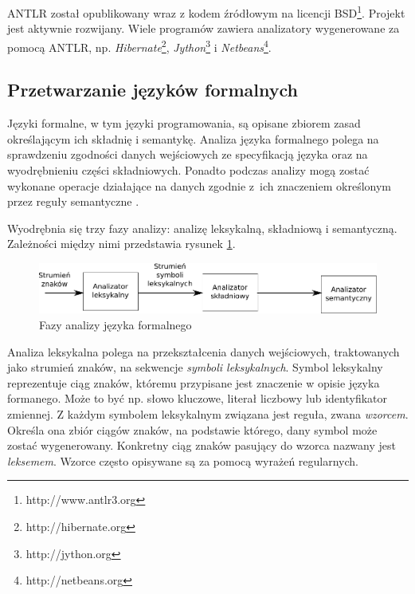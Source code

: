 ANTLR został opublikowany wraz z kodem źródłowym na licencji BSD\footnote{http://www.antlr3.org}. 
Projekt jest
aktywnie rozwijany. Wiele programów zawiera analizatory wygenerowane za pomocą
ANTLR, np. \emph{Hibernate}\footnote{http://hibernate.org}, \emph{Jython}\footnote{http://jython.org}
i \emph{Netbeans}\footnote{http://netbeans.org}.

\subsection{Przetwarzanie języków formalnych}
Języki formalne, w tym języki programowania, są opisane zbiorem zasad określającym
ich składnię i semantykę. Analiza języka formalnego polega na sprawdzeniu zgodności
danych wejściowych ze specyfikacją języka oraz na wyodrębnieniu części składniowych.
Ponadto podczas analizy mogą zostać wykonane operacje działające na danych zgodnie
z~ich znaczeniem określonym przez reguły semantyczne \cite{compilers}.

Wyodrębnia się trzy fazy analizy: analizę leksykalną, składniową i semantyczną. 
Zależności między nimi przedstawia rysunek \ref{antlr_phases}. 


\begin{figure}[h]
  \centering
    \includegraphics[width=\textwidth]{img/antlr_phases.pdf}
    \caption{Fazy analizy języka formalnego}
    \label{antlr_phases}
\end{figure}


Analiza leksykalna polega na przekształcenia danych wejściowych, traktowanych jako 
strumień znaków, na sekwencje \emph{symboli leksykalnych}. Symbol leksykalny reprezentuje
ciąg znaków, któremu przypisane jest znaczenie w opisie języka formanego. Może to 
być np. słowo kluczowe, literał liczbowy lub identyfikator zmiennej.
Z każdym symbolem leksykalnym związana jest reguła, zwana \emph{wzorcem}. Określa ona
zbiór ciągów znaków, na podstawie którego, dany symbol może zostać wygenerowany.
Konkretny ciąg znaków pasujący do wzorca nazwany jest \emph{leksemem}.
Wzorce często opisywane są za pomocą wyrażeń regularnych.

